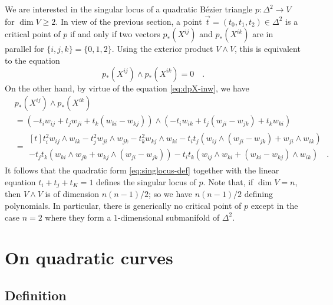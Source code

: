 \documentclass[pdftex,a4paper,12pt]{scrartcl}
\theoremstyle{plain}
\theoremstyle{definition}
\theoremstyle{remark}
\begin{document}
We are interested in the singular locus of a quadratic B\'ezier triangle $p:\Delta^2\to V$ for $\dim V\ge 2$.
In view of the previous section, a point $\vec t=(t_0,t_1,t_2)\in\Delta^2$ is a critical point of $p$ if and only if two vectors $p_\ast(X^{ij})$ and $p_\ast(X^{ik})$ are in parallel for $\{i,j,k\}=\{0,1,2\}$.
Using the exterior product $V\wedge V$, this is equivalent to the equation
\[
p_\ast(X^{ij})\wedge p_\ast(X^{ik})=0
\quad.
\]
On the other hand, by virtue of the equation \eqref{eq:dpX-inw}, we have
\begin{equation}
\label{eq:singlocus-def}
\begin{split}
& p_\ast(X^{ij})\wedge p_\ast(X^{ik}) \\
&= \left(-t_iw_{ij}+t_jw_{ji}+t_k(w_{ki}-w_{kj})\right)\wedge\left(-t_iw_{ik}+t_j(w_{ji}-w_{jk})+t_kw_{ki}\right) \\
&=
\begin{multlined}[t]
t_i^2 w_{ij}\wedge w_{ik}-t_j^2w_{ji}\wedge w_{jk}-t_k^2w_{kj}\wedge w_{ki}
- t_it_j\left(w_{ij}\wedge(w_{ji}-w_{jk})+w_{ji}\wedge w_{ik}\right) \\
- t_jt_k\left(w_{ki}\wedge w_{jk}+w_{kj}\wedge(w_{ji}-w_{jk})\right)
- t_it_k\left(w_{ij}\wedge w_{ki}+(w_{ki}-w_{kj})\wedge w_{ik}\right)
\quad.
\end{multlined}
\end{split}
\end{equation}
It follows that the quadratic form \eqref{eq:singlocus-def} together with the linear equation $t_i+t_j+t_K=1$ defines the singular locus of $p$.
Note that, if $\dim V=n$, then $V\wedge V$ is of dimension $n(n-1)/2$; so we have $n(n-1)/2$ defining polynomials.
In particular, there is generically no critical point of $p$ except in the case $n=2$ where they form a $1$-dimensional submanifold of $\Delta^2$.


\section{On quadratic curves}

\subsection{Definition}
\end{document}
